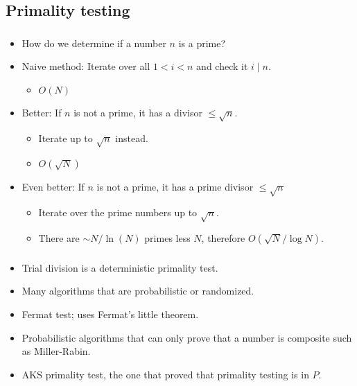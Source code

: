 \documentclass[10pt]{beamer}
\newcommand{\bi}{\begin{itemize}}
\newcommand{\ei}{\end{itemize}}
\begin{document}

\subsection{Primality testing}
\begin{frame}
  \frametitle{\insertsubsection}
  \vspace{20pt}
  \bi
    \item How do we determine if a number $n$ is a prime?
    \item {\color{title}Naive method:} Iterate over all $1 < i < n$ and check it
      $i \mid n$.
      \bi
        \item  $O(N)$
      \ei
    \item {\color{title}Better:} If $n$ is not a prime, it has a divisor $\leq \sqrt{n}$.
      \bi
        \item Iterate up to $\sqrt{n}$ instead.
        \item $O(\sqrt{N})$
      \ei
    \item {\color{title}Even better:} If $n$ is not a prime, it has a prime divisor $\leq \sqrt{n}$
      \bi
        \item Iterate over the prime numbers up to $\sqrt{n}$.
        \item There are $\sim N/\ln(N)$ primes less $N$, therefore $O(\sqrt{N}/\log N)$.
      \ei
  \ei
\end{frame}

\begin{frame}
  \frametitle{\insertsubsection}
  \vspace{40pt}
  \bi
    \item Trial division is a deterministic primality test.
    \item Many algorithms that are probabilistic or randomized.
    \item Fermat test; uses Fermat's little theorem.
    \item Probabilistic algorithms that can only prove that a number is
      composite such as Miller-Rabin.
    \item AKS primality test, the one that proved that primality testing is in
      $P$.
  \ei
\end{frame}
\end{document}
